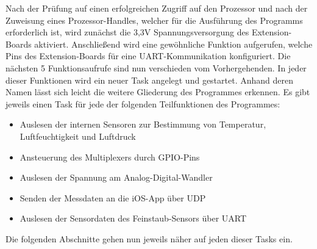 Nach der Prüfung auf einen erfolgreichen Zugriff auf den Prozessor und nach der Zuweisung eines Prozessor-Handles, welcher für die Ausführung des Programms erforderlich ist, wird zunächst die 3,3V Spannungsversorgung des Extension-Boards aktiviert. Anschließend wird eine gewöhnliche Funktion aufgerufen, welche Pins des Extension-Boards für eine \acs{UART}-Kommunikation konfiguriert. 
\newline
Die nächsten 5 Funktionsaufrufe sind nun verschieden vom Vorhergehenden. In jeder dieser Funktionen wird ein neuer Task angelegt und gestartet. Anhand deren Namen lässt sich leicht die weitere Gliederung des Programmes erkennen. 
\newline
Es gibt jeweils einen Task für jede der folgenden Teilfunktionen des Programmes:
\begin{itemize}
	\item Auslesen der internen Sensoren zur Bestimmung von Temperatur, Luftfeuchtigkeit und Luftdruck
	\item Ansteuerung des Multiplexers durch \acs{GPIO}-Pins 
	\item Auslesen der Spannung am Analog-Digital-Wandler
	\item Senden der Messdaten an die iOS-App über \acs{UDP}
	\item Auslesen der Sensordaten des Feinstaub-Sensors über \acs{UART}
\end{itemize}
Die folgenden Abschnitte gehen nun jeweils näher auf jeden dieser Tasks ein.

